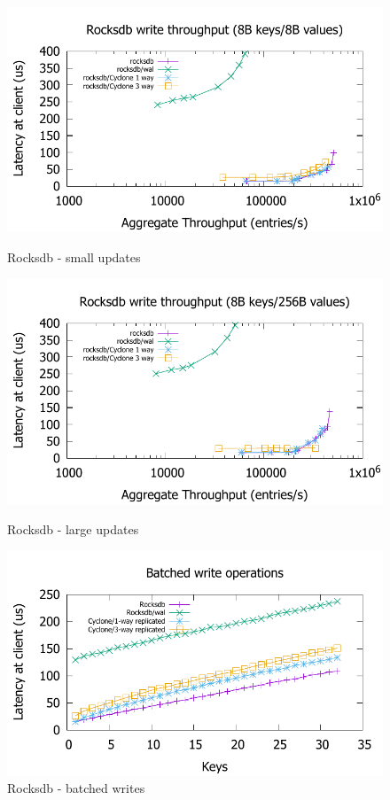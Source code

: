 \documentclass[pageno]{jpaper}
\begin{document}
\begin{figure}
  \begin{minipage}{0.33\textwidth}
    \centering
    \includegraphics[scale=0.45]{results2/rocksdb.pdf}
    \caption{Rocksdb - small updates}
    \label{fig:rocksdb}
  \end{minipage} 
  \begin{minipage}{0.33\textwidth}
    \includegraphics[scale=0.45]{results2/rocksdb_256.pdf}
    \caption{Rocksdb - large updates}
    \label{fig:rocksdb_256}
  \end{minipage} 
  \begin{minipage}{0.33\textwidth}
    \includegraphics[scale=0.45]{results2/rocksdb_multi.pdf}
    \caption{Rocksdb - batched writes}
    \label{fig:rocksdb_multi}
  \end{minipage}
\end{figure}
\end{document}
